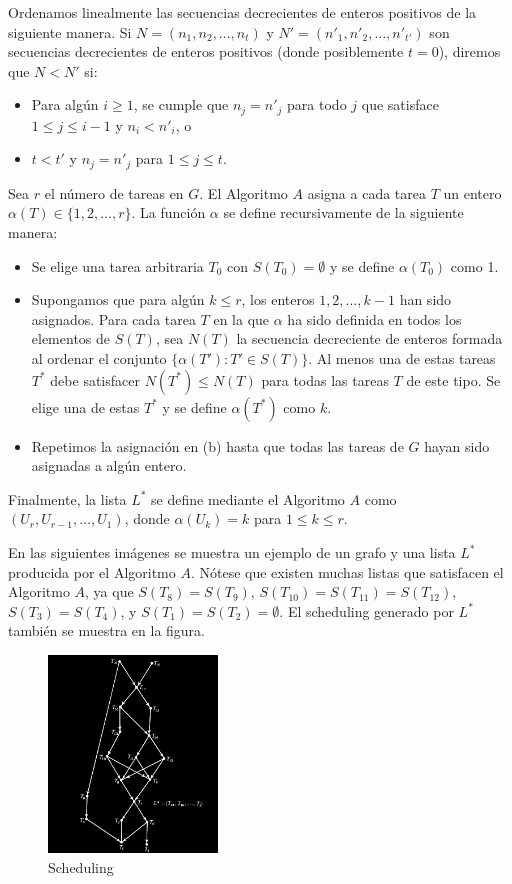 \documentclass[14pt]{extarticle}
\begin{document}
Ordenamos linealmente las secuencias decrecientes de enteros positivos de la siguiente manera. Si $N = (n_1, n_2, \ldots, n_t)$ y $N' = (n'_1, n'_2, \ldots, n'_{t'})$ son secuencias decrecientes de enteros positivos (donde posiblemente $t = 0$), diremos que $N < N'$ si:

\begin{itemize}
    \item Para algún $i \geq 1$, se cumple que $n_j = n'_j$ para todo $j$ que satisface $1 \leq j \leq i - 1$ y $n_i < n'_i$, o
    \item $t < t'$ y $n_j = n'_j$ para $1 \leq j \leq t$.
\end{itemize}

Sea $r$ el número de tareas en $G$. El Algoritmo $A$ asigna a cada tarea $T$ un entero $\alpha(T) \in \{1, 2, \ldots, r\}$. La función $\alpha$ se define recursivamente de la siguiente manera:

\begin{itemize}
    \item Se elige una tarea arbitraria $T_0$ con $S(T_0) = \emptyset$ y se define $\alpha(T_0)$ como 1.
    \item Supongamos que para algún $k \leq r$, los enteros $1, 2, \ldots, k - 1$ han sido asignados. Para cada tarea $T$ en la que $\alpha$ ha sido definida en todos los elementos de $S(T)$, sea $N(T)$ la secuencia decreciente de enteros formada al ordenar el conjunto $\{\alpha(T'): T' \in S(T)\}$. Al menos una de estas tareas $T^*$ debe satisfacer $N(T^*) \leq N(T)$ para todas las tareas $T$ de este tipo. Se elige una de estas $T^*$ y se define $\alpha(T^*)$ como $k$.
    \item Repetimos la asignación en (b) hasta que todas las tareas de $G$ hayan sido asignadas a algún entero.
\end{itemize}

Finalmente, la lista $L^*$ se define mediante el Algoritmo $A$ como $(U_r, U_{r-1}, \ldots, U_1)$, donde $\alpha(U_k) = k$ para $1 \leq k \leq r$.

En las siguientes imágenes se muestra un ejemplo de un grafo y una lista $L^*$ producida por el Algoritmo $A$. Nótese que existen muchas listas que satisfacen el Algoritmo $A$, ya que $S(T_8) = S(T_9)$, $S(T_{10}) = S(T_{11}) = S(T_{12})$, $S(T_3) = S(T_4)$, y $S(T_1) = S(T_2) = \emptyset$. El scheduling generado por $L^*$ también se muestra en la figura.

\begin{figure}[h]
    \centering
    \includegraphics[width=0.4\textwidth]{images/partial_order.png}
    \caption{Scheduling}
\end{figure}
\end{document}
